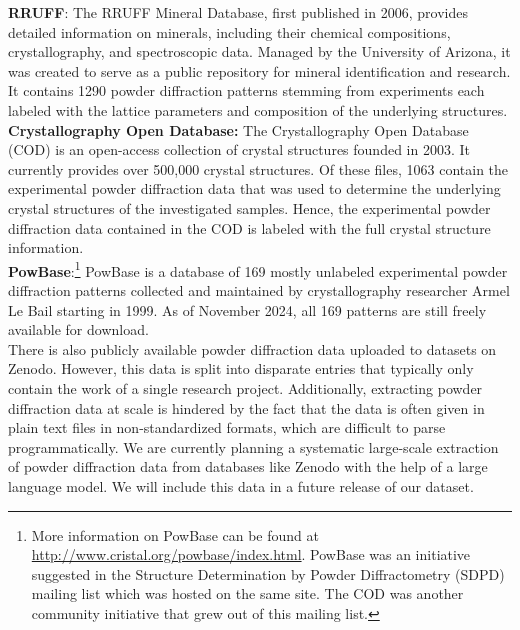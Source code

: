 \textbf{RRUFF}: \cite{RRUFFWeb} The RRUFF Mineral Database, first published in 2006, provides detailed information on minerals, including their chemical compositions, crystallography, and spectroscopic data. \cite{lafuente2015} Managed by the University of Arizona, it was created to serve as a public repository for mineral identification and research. It contains \num{1290} powder diffraction patterns stemming from experiments each labeled with the lattice parameters and composition of the underlying structures. \\

\textbf{Crystallography Open Database:} \cite{CODWeb} The Crystallography Open Database (COD) is an open-access collection of crystal structures founded in 2003\cite{Graulis2009cod}. It currently provides over 500,000 crystal structures. Of these files, 1063 contain the experimental powder diffraction data that was used to determine the underlying crystal structures of the investigated samples. Hence, the experimental powder diffraction data contained in the COD is labeled with the full crystal structure information. \\

\textbf{PowBase}:\footnote{More information on PowBase can be found at \url{http://www.cristal.org/powbase/index.html}. PowBase was an initiative suggested in the Structure Determination by Powder Diffractometry (SDPD) mailing list which was hosted on the same site. The COD was another community initiative that grew out of this mailing list.} PowBase is a database of 169 mostly unlabeled experimental powder diffraction patterns collected and maintained by crystallography researcher Armel Le Bail starting in 1999. As of November 2024, all 169 patterns are still freely available for download. \\

There is also publicly available powder diffraction data uploaded to datasets on Zenodo. However, this data is split into disparate entries that typically only contain the work of a single research project. Additionally, extracting powder diffraction data at scale is hindered by the fact that the data is often given in plain text files in non-standardized formats, which are difficult to parse programmatically. We are currently planning a systematic large-scale extraction of powder diffraction data from databases like Zenodo with the help of a large language model. We will include this data in a future release of our dataset.\\

